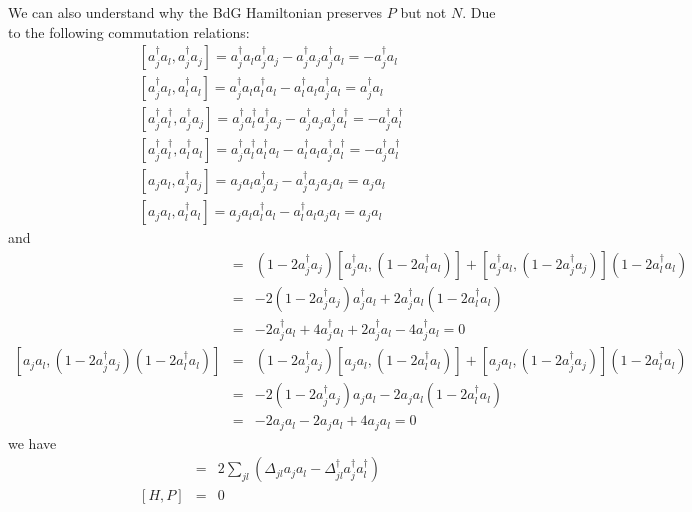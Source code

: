 We can also understand why the BdG Hamiltonian preserves $P$ but not $N$. Due to the following commutation relations:
\begin{eqnarray}
	&&[a_j^\dag a_{l}, a_j^\dag a_j ] = a_j^\dag a_{l} a_j^\dag a_j - a_j^\dag a_j a_j^\dag a_{l} = - a_j^\dag a_l\\\nonumber
	&&[a_j^\dag a_{l}, a_l^\dag a_l ] = a_j^\dag a_{l} a_l^\dag a_l - a_l^\dag a_l a_j^\dag a_{l} = a_j^\dag a_l\\\nonumber
	&&[a_j^\dag a^\dag_{l}, a_j^\dag a_j ] = a_j^\dag a^\dag_{l} a_j^\dag a_j - a_j^\dag a_j a_j^\dag a^\dag_{l} = - a_j^\dag a_l^\dag\\\nonumber
	&&[a_j^\dag a^\dag_{l}, a_l^\dag a_l ] = a_j^\dag a^\dag_{l} a_l^\dag a_l - a_l^\dag a_l a_j^\dag a^\dag_{l} = - a_j^\dag a_l^\dag\\\nonumber
	&&[a_j a_l, a_j^\dag a_j ] = a_j a_{l} a_j^\dag a_j - a_j^\dag a_j a_j a_{l} =  a_j a_l\\\nonumber
	&&[a_j a_{l}, a_l^\dag a_l ] = a_j a_{l} a_l^\dag a_l - a_l^\dag a_l a_j a_{l} = a_j a_l
\end{eqnarray}
and
\begin{eqnarray}
	[a_j^\dag a_{l}, (1-2a_j^\dag a_j)(1-2a_l^\dag a_l) ] &=& (1-2a_j^\dag a_j)[a_j^\dag a_{l}, (1-2a_l^\dag a_l) ] + 	[a_j^\dag a_{l}, (1-2a_j^\dag a_j)](1-2a_l^\dag a_l) \\\nonumber
	&=& -2(1-2a_j^\dag a_j)a_j^\dag a_l + 2a_j^\dag a_l (1-2a_l^\dag a_l) \\\nonumber
	&=& -2 a_j^\dag a_l + 4 a_j^\dag a_l +  2 a_j^\dag a_l - 4 a_j^\dag a_l = 0 \\\nonumber
	[a_j a_{l}, (1-2a_j^\dag a_j)(1-2a_l^\dag a_l) ] &=& (1-2a_j^\dag a_j)[a_j a_{l}, (1-2a_l^\dag a_l) ] + 	[a_j a_{l}, (1-2a_j^\dag a_j)](1-2a_l^\dag a_l) \\\nonumber
	&=& -2(1-2a_j^\dag a_j)a_j a_l - 2a_j a_l (1-2a_l^\dag a_l) \\\nonumber
	&=& -2 a_j a_l -  2 a_j a_l + 4 a_j a_l =0
\end{eqnarray}
we have
\begin{eqnarray}
	[H, N] &=& 2\sum_{jl} (\Delta_{jl} a_j a_l - \Delta^\dag_{jl} a_j^\dag a_l^\dag ) \\\nonumber
	[H, P] &=& 0
\end{eqnarray}

